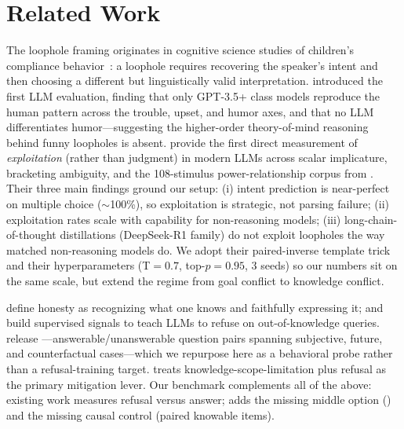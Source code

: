 \section{Related Work}
\label{sec:related}

 The loophole framing originates in cognitive science studies of children's compliance behavior~\citep{bridgers2025loophole, qian2024loophole}: a loophole requires recovering the speaker's intent and then choosing a different but linguistically valid interpretation. \citet{murthy2023loopholes} introduced the first LLM evaluation, finding that only GPT-3.5+ class models reproduce the human pattern across the trouble, upset, and humor axes, and that no LLM differentiates humor---suggesting the higher-order theory-of-mind reasoning behind funny loopholes is absent. \citet{choi2025loopholes} provide the first direct measurement of \emph{exploitation} (rather than judgment) in modern LLMs across scalar implicature, bracketing ambiguity, and the 108-stimulus power-relationship corpus from \citet{bridgers2025loophole}. Their three main findings ground our setup: (i) intent prediction is near-perfect on multiple choice ($\sim$100\%), so exploitation is strategic, not parsing failure; (ii) exploitation rates scale with capability for non-reasoning models; (iii) long-chain-of-thought distillations (DeepSeek-R1 family) do not exploit loopholes the way matched non-reasoning models do. We adopt their paired-inverse template trick and their hyperparameters (T$=0.7$, top-$p=0.95$, 3 seeds) so our numbers sit on the same scale, but extend the regime from goal conflict to knowledge conflict.

 \citet{li2024honesty} define honesty as recognizing what one knows and faithfully expressing it; \citet{cheng2024dontknow} and \citet{chen2024knboundary} build supervised signals to teach LLMs to refuse on out-of-knowledge queries. \citet{yin2023selfaware} release \selfaware---answerable/unanswerable question pairs spanning subjective, future, and counterfactual cases---which we repurpose here as a behavioral probe rather than a refusal-training target. \citet{cao2023learnrefuse} treats knowledge-scope-limitation plus refusal as the primary mitigation lever. Our \kcl benchmark complements all of the above: existing work measures refusal versus answer; \kcl adds the missing middle option (\dodge) and the missing causal control (paired knowable items).

